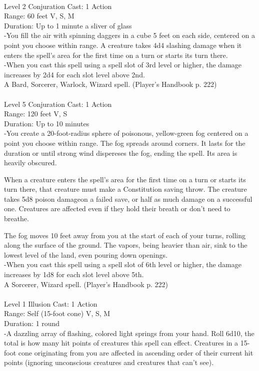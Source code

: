 \documentclass[10pt,twocolumn]{report}
\begin{document}
 \\
Level 2 \quad Conjuration \quad Cast: 1 Action\\
Range: 60 feet \quad V, S, M \\
Duration: Up to 1 minute \quad a sliver of glass\\
-You fill the air with spinning daggers in a cube 5 feet on each side, centered on a point you choose within range. A creature takes 4d4 slashing damage when it enters the spell’s area for the first time on a turn or starts its turn there.\\
-When you cast this spell using a spell slot of 3rd level or higher, the damage increases by 2d4 for each slot level above 2nd.\\
A Bard, Sorcerer, Warlock, Wizard spell. (Player's Handbook p. 222) \\


 \\
Level 5 \quad Conjuration \quad Cast: 1 Action\\
Range: 120 feet \quad V, S\\
Duration: Up to 10 minutes \quad \\
-You create a 20-foot-radius sphere of poisonous, yellow-green fog centered on a point you choose within range. The fog spreads around corners. It lasts for the duration or until strong wind dispereses the fog, ending the spell. Its area is heavily obscured. 

When a creature enters the spell’s area for the first time on a turn or starts its turn there, that creature must make a Constitution saving throw. The creature takes 5d8 poison damageon a failed save, or half as much damage on a successful one. Creatures are affected even if they hold their breath or don’t need to breathe. 

The fog moves 10 feet away from you at the start of each of your turns, rolling along the surface of the ground. The vapors, being heavier than air, sink to the lowest level of the land, even pouring down openings.\\
-When you cast this spell using a spell slot of 6th level or higher, the damage increases by 1d8 for each slot level above 5th.\\
A Sorcerer, Wizard spell. (Player's Handbook p. 222) \\


 \\
Level 1 \quad Illusion \quad Cast: 1 Action\\
Range: Self (15-foot cone) \quad V, S, M\\
Duration: 1 round \quad \\
-A dazzling array of flashing, colored light springs from your hand. 
Roll 6d10, the total is how many hit points of creatures this spell can effect. Creatures in a 15-foot cone originating from you are affected in ascending order of their current hit points (ignoring unconscious creatures and creatures that can’t see). 
\end{document}
